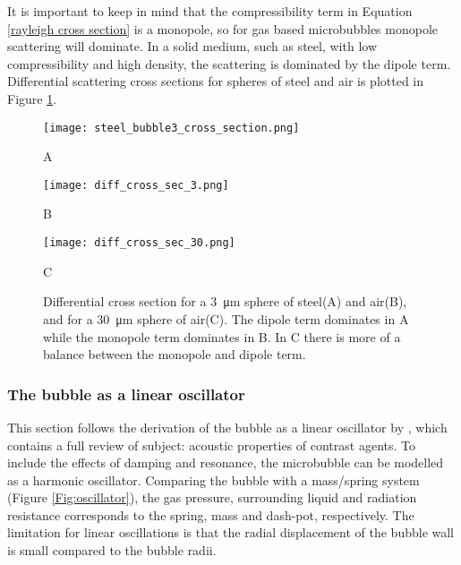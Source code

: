 It is important to keep in mind that the compressibility term in Equation \ref{rayleigh cross section} is a monopole, so for gas based microbubbles monopole scattering will dominate. In a solid medium, such as steel, with low compressibility and high density, the scattering is dominated by the dipole term. Differential scattering cross sections for spheres of steel and air is plotted in Figure \ref{fig:diff cross_sec}.
\begin{figure}[h]
	\centering
	    \begin{minipage}[b]{0.3\textwidth}
			\texttt{[image: steel\_bubble3\_cross\_section.png]}
			    \caption{A}
                \label{fig:diff cross sec_steel}
		\end{minipage}%
    	\begin{minipage}[b]{0.3\textwidth}
			\texttt{[image: diff\_cross\_sec\_3.png]}
			    \caption{B}
                \label{fig:diff cross sec_air}
		\end{minipage}%
		\begin{minipage}[b]{0.3\textwidth}
			\texttt{[image: diff\_cross\_sec\_30.png]}
			    \caption{C}
                \label{fig:diff cross sec air_30}
		\end{minipage}%
		
  \caption{Differential cross section for a \SI{3}{\micro\meter} sphere of steel(A) and air(B), and for a \SI{30}{\micro\meter} sphere of air(C)\cite{Healey2012}. The dipole term dominates in A while the monopole term dominates in B. In C there is more of a balance between the monopole and dipole term.}
  \label{fig:diff cross_sec}
\end{figure} 




\subsubsection{The bubble as a linear oscillator}
This section follows the derivation of the bubble as a linear oscillator by \citet{Hoff2000}, which contains a full review of subject: acoustic properties of contrast agents. To include the effects of damping and resonance, the microbubble can be modelled as a harmonic oscillator. Comparing the bubble with a mass/spring system (Figure \ref{Fig:oscillator}), the gas pressure, surrounding liquid and radiation resistance corresponds to the spring, mass and dash-pot, respectively. The limitation for linear oscillations is that the radial displacement of the bubble wall is small compared to the bubble radii. 

